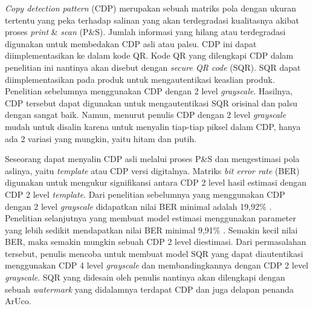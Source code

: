 \emph{Copy detection pattern} (CDP) merupakan sebuah matriks pola dengan ukuran tertentu yang peka terhadap salinan yang akan terdegradasi kualitasnya akibat proses \emph{print} \&
\emph{scan} (P\&S). Jumlah informasi yang hilang atau terdegradasi digunakan untuk membedakan CDP asli atau palsu. CDP ini dapat diimplementasikan ke dalam kode QR.
Kode QR yang dilengkapi CDP dalam penelitian ini nantinya akan disebut dengan \emph{secure QR code} (SQR). SQR dapat diimplementasikan pada produk untuk
mengautentikasi keaslian produk. Penelitian sebelumnya menggunakan CDP dengan 2 level \emph{grayscale}. Hasilnya, CDP tersebut dapat digunakan untuk
mengautentikasi SQR orisinal dan palsu dengan sangat baik. Namun, menurut penulis CDP dengan 2 level \emph{grayscale} mudah untuk disalin karena untuk menyalin
tiap-tiap piksel dalam CDP, hanya ada 2 variasi yang mungkin, yaitu hitam dan putih.

Seseorang dapat menyalin CDP asli melalui proses P\&S dan mengestimasi pola aslinya, yaitu \emph{template} atau CDP versi digitalnya. Matriks \emph{bit error
      rate} (BER) digunakan untuk mengukur signifikansi antara CDP 2 level hasil estimasi dengan CDP 2 level \emph{template}. Dari penelitian sebelumnya yang
menggunakan CDP dengan 2 level \emph{grayscale} didapatkan nilai BER minimal adalah 19,92\% \cite{PICARDCANCOPYDETECTIONPATTERN}. Penelitian selanjutnya yang
membuat model estimasi menggunakan parameter yang lebih sedikit mendapatkan nilai BER minimal 9,91\% \cite{penelitianpaksyukron}. Semakin kecil nilai BER, maka
semakin mungkin sebuah CDP 2 level diestimasi. Dari permasalahan tersebut, penulis mencoba untuk membuat model SQR yang dapat diautentikasi menggunakan CDP 4
level \emph{grayscale} dan membandingkannya dengan CDP 2 level \emph{grayscale}. SQR yang didesain oleh penulis nantinya akan dilengkapi dengan sebuah
\emph{watermark} yang didalamnya terdapat CDP dan juga delapan penanda ArUco.

